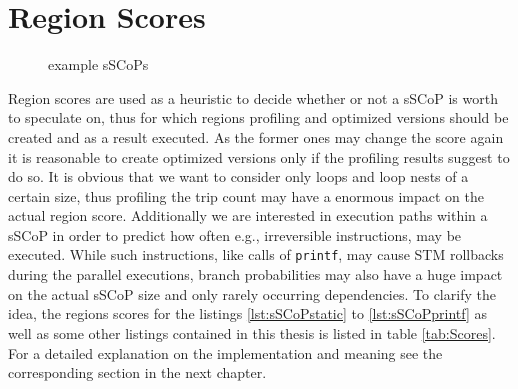 \section{Region Scores}
\label{RegionScores}
\lstset{frame=none}
\begin{figure}[h]
  \centering

  \caption{example sSCoPs}
  \label{fig:ScoredSCoPs}
\end{figure}
\resetlst
Region scores are used as a heuristic to decide whether or not a sSCoP is worth
to speculate on, thus for which regions profiling and optimized versions should
be created and as a result executed.
As the former ones may change the score again it is reasonable to create 
optimized versions only if the profiling results suggest to do so. 
It is obvious that we want to consider only loops and loop nests of a certain size,
thus profiling the trip count may have a enormous impact on the actual region score.
Additionally we are interested in execution paths within a sSCoP in order to predict how often
e.g., irreversible instructions, may be executed. While such instructions, like
calls of \texttt{printf}, may cause STM rollbacks during the parallel executions, 
branch probabilities may also have a huge impact on the actual sSCoP size and
only rarely occurring dependencies. 
To clarify the idea,  the regions scores for the listings \ref{lst:sSCoPstatic}
to \ref{lst:sSCoPprintf} as well as some other listings contained in this 
thesis is listed in table \ref{tab:Scores}. For a detailed explanation on the 
implementation and meaning see the corresponding section in the next chapter. 

